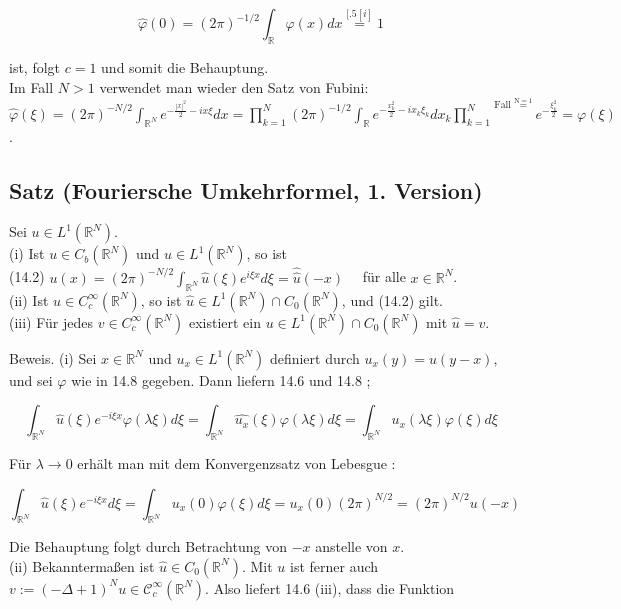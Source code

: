 \documentclass[10pt, letterpaper]{article}
\begin{document}
$$
\hat{\varphi}(0)=(2 \pi)^{-1 / 2} \int_{\mathbb{R}} \varphi(x) d x \stackrel{[.5[i]}{=} 1
$$

ist, folgt $c=1$ und somit die Behauptung.\\
Im Fall $N>1$ verwendet man wieder den Satz von Fubini:\\
$\hat{\varphi}(\xi)=(2 \pi)^{-N / 2} \int_{\mathbb{R}^{N}} e^{-\frac{|x|^{2}}{2}-i x \xi} d x=\prod_{k=1}^{N}(2 \pi)^{-1 / 2} \int_{\mathbb{R}} e^{-\frac{x_{k}^{2}}{2}-i x_{k} \xi_{k}} d x_{k} \stackrel{\text { Fall } \stackrel{\mathrm{N}=1}{=}}{\prod_{k=1}^{N}} e^{-\frac{\xi_{k}^{2}}{2}}=\varphi(\xi)$.

\subsection*{Satz (Fouriersche Umkehrformel, 1. Version)}
Sei $u \in L^{1}\left(\mathbb{R}^{N}\right)$.\\
(i) Ist $u \in C_{b}\left(\mathbb{R}^{N}\right)$ und $\hat{u} \in L^{1}\left(\mathbb{R}^{N}\right)$, so ist\\
(14.2) $u(x)=(2 \pi)^{-N / 2} \int_{\mathbb{R}^{N}} \hat{u}(\xi) e^{i \xi x} d \xi=\hat{\hat{u}}(-x) \quad$ für alle $x \in \mathbb{R}^{N}$.\\
(ii) Ist $u \in C_{c}^{\infty}\left(\mathbb{R}^{N}\right)$, so ist $\hat{u} \in L^{1}\left(\mathbb{R}^{N}\right) \cap C_{0}\left(\mathbb{R}^{N}\right)$, und (14.2) gilt.\\
(iii) Für jedes $v \in C_{c}^{\infty}\left(\mathbb{R}^{N}\right)$ existiert ein $u \in L^{1}\left(\mathbb{R}^{N}\right) \cap C_{0}\left(\mathbb{R}^{N}\right)$ mit $\hat{u}=v$.

Beweis. (i) Sei $x \in \mathbb{R}^{N}$ und $u_{x} \in L^{1}\left(\mathbb{R}^{N}\right)$ definiert durch $u_{x}(y)=u(y-x)$, und sei $\varphi$ wie in 14.8 gegeben. Dann liefern 14.6 und 14.8 ;

$$
\int_{\mathbb{R}^{N}} \hat{u}(\xi) e^{-i \xi x} \varphi(\lambda \xi) d \xi=\int_{\mathbb{R}^{N}} \widehat{u_{x}}(\xi) \varphi(\lambda \xi) d \xi=\int_{\mathbb{R}^{N}} u_{x}(\lambda \xi) \varphi(\xi) d \xi
$$

Für $\lambda \rightarrow 0$ erhält man mit dem Konvergenzsatz von Lebesgue :

$$
\int_{\mathbb{R}^{N}} \hat{u}(\xi) e^{-i \xi x} d \xi=\int_{\mathbb{R}^{N}} u_{x}(0) \varphi(\xi) d \xi=u_{x}(0)(2 \pi)^{N / 2}=(2 \pi)^{N / 2} u(-x)
$$

Die Behauptung folgt durch Betrachtung von $-x$ anstelle von $x$.\\
(ii) Bekanntermaßen ist $\hat{u} \in C_{0}\left(\mathbb{R}^{N}\right)$. Mit $u$ ist ferner auch $v:=(-\Delta+1)^{N} u \in \mathcal{C}_{c}^{\infty}\left(\mathbb{R}^{N}\right)$. Also liefert 14.6 (iii), dass die Funktion
\end{document}
